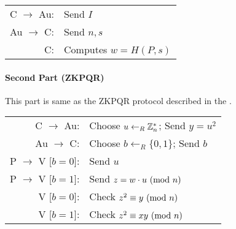 \bigskip

\begin{center}
	\begin{tabular}{rl}
	C $\rightarrow$ Au: & Send $I$\\
	Au $\rightarrow$ C: & Send $n, s$\\
	C: & Computes $w = H(P, s)$\\
\end{tabular}
\end{center}

\paragraph{Second Part (ZKPQR)}
This part is same as the ZKPQR protocol described in the \cite{GMR}.

\bigskip

\begin{center}
\begin{tabular}{rl}
	C $\rightarrow$ Au: & Choose $u \leftarrow_R \Bbb{Z}_{n}^{*}$; Send $y = u^2$\\
	Au $\rightarrow$ C: & Choose $b \leftarrow_R \{0, 1\} $; Send $b$\\
	P $\rightarrow$ V [$b = 0$]: & Send $u$\\
	P $\rightarrow$ V [$b = 1$]: & Send $z = w \cdot u \ (\mathrm{mod}\ n)$\\
	V [$b = 0$]: & Check $z^2 \equiv y \ (\mathrm{mod}\ n)$\\
	V [$b = 1$]: & Check $z^2 \equiv xy \ (\mathrm{mod}\ n)$\\
\end{tabular}
\end{center}


